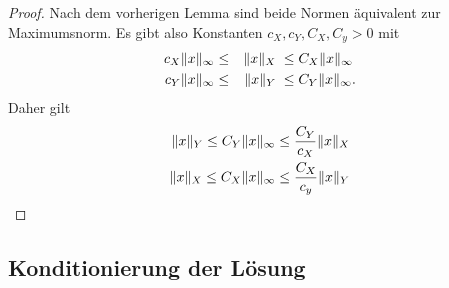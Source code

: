 \begin{proof}
  Nach dem vorherigen Lemma sind beide Normen äquivalent zur Maximumsnorm. Es gibt also Konstanten $c_X, c_Y, C_X, C_y>0$ mit
  \begin{gather}
    \begin{aligned}
     c_X \lVert x\rVert_\infty &\le &\lVert x\rVert_X \;&\le C_X \lVert x\rVert_\infty\\
     c_Y \lVert x\rVert_\infty &\le &\lVert x\rVert_Y \;&\le C_Y \lVert x\rVert_\infty.
    \end{aligned}
  \end{gather}
  Daher gilt
  \begin{gather}
    \begin{split}
      \lVert x\rVert_Y \le C_Y\lVert x\rVert_\infty &\le \frac{C_Y}{c_X} \lVert x\rVert_X\\
      \lVert x\rVert_X \le C_X\lVert x\rVert_\infty &\le \frac{C_X}{c_y} \lVert x\rVert_Y
    \end{split}
  \end{gather}
\end{proof}

\subsection{Konditionierung der Lösung}


